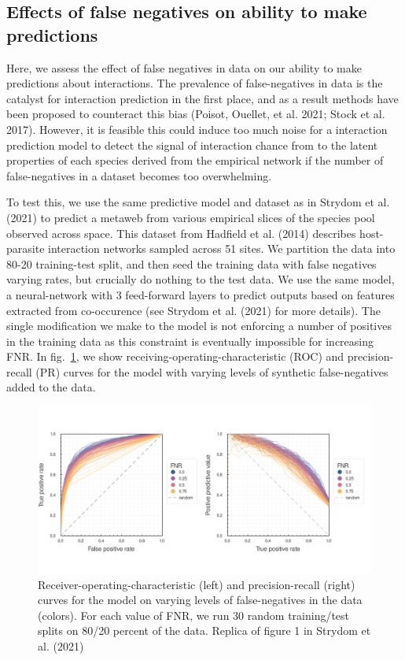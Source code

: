 \documentclass[10pt,oneside]{article}
\makeatletter
\def\maxwidth{\ifdim\Gin@nat@width>\linewidth\linewidth
\else\Gin@nat@width\fi}
\let\Oldincludegraphics\includegraphics
\renewcommand{\includegraphics}[1]{\Oldincludegraphics[width=\maxwidth]{#1}}
\makeatother
\begin{document}
\hypertarget{effects-of-false-negatives-on-ability-to-make-predictions}{%
\subsection{Effects of false negatives on ability to make
predictions}\label{effects-of-false-negatives-on-ability-to-make-predictions}}

Here, we assess the effect of false negatives in data on our ability to
make predictions about interactions. The prevalence of false-negatives
in data is the catalyst for interaction prediction in the first place,
and as a result methods have been proposed to counteract this bias
(Poisot, Ouellet, et al. 2021; Stock et al. 2017). However, it is
feasible this could induce too much noise for a interaction prediction
model to detect the signal of interaction chance from to the latent
properties of each species derived from the empirical network if the
number of false-negatives in a dataset becomes too overwhelming.

To test this, we use the same predictive model and dataset as in Strydom
et al. (2021) to predict a metaweb from various empirical slices of the
species pool observed across space. This dataset from Hadfield et al.
(2014) describes host-parasite interaction networks sampled across 51
sites. We partition the data into 80-20 training-test split, and then
seed the training data with false negatives varying rates, but crucially
do nothing to the test data. We use the same model, a neural-network
with 3 feed-forward layers to predict outputs based on features
extracted from co-occurence (see Strydom et al. (2021) for more
details). The single modification we make to the model is not enforcing
a number of positives in the training data as this constraint is
eventually impossible for increasing FNR. In fig.~\ref{fig:rocpr}, we
show receiving-operating-characteristic (ROC) and precision-recall (PR)
curves for the model with varying levels of synthetic false-negatives
added to the data.

\begin{figure}
\hypertarget{fig:rocpr}{%
\centering
\includegraphics{./figures/rocpr_falsenegatives.png}
\caption{Receiver-operating-characteristic (left) and precision-recall
(right) curves for the model on varying levels of false-negatives in the
data (colors). For each value of FNR, we run 30 random training/test
splits on 80/20 percent of the data. Replica of figure 1 in Strydom et
al. (2021)}\label{fig:rocpr}
}
\end{figure}
\end{document}
